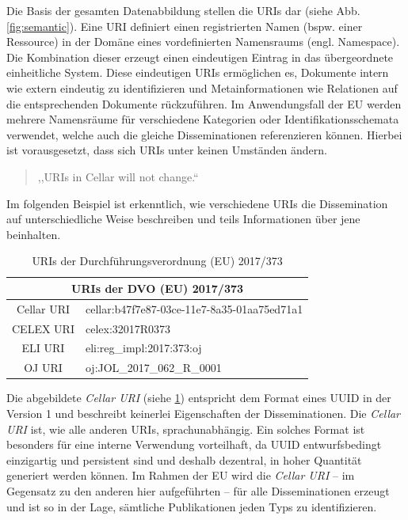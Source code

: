     Die Basis der gesamten Datenabbildung stellen die \acfp{URI} dar (siehe Abb. \ref{fig:semantic}).
    Eine URI definiert einen registrierten Namen (bspw. einer Ressource) in der Domäne eines vordefinierten Namensraums (engl. Namespace).
    Die Kombination dieser erzeugt einen eindeutigen Eintrag in das übergeordnete einheitliche System.
    \cite[2]{eu_uri_rfc1630}
    Diese eindeutigen \acp{URI} ermöglichen es, Dokumente intern wie extern eindeutig zu identifizieren und Metainformationen wie Relationen auf die entsprechenden Dokumente rückzuführen.
    Im Anwendungsfall der \ac{EU} werden mehrere Namensräume für verschiedene Kategorien oder Identifikationsschemata verwendet, welche auch die gleiche Disseminationen referenzieren können.
    Hierbei ist vorausgesetzt, dass sich \acp{URI} unter keinen Umständen ändern.
    \begin{quote}
        ,,URIs in Cellar will not change.`` \cite[9]{eu_cellar}
    \end{quote}
    Im folgenden Beispiel ist erkenntlich, wie verschiedene \acp{URI} die Dissemination auf unterschiedliche Weise beschreiben und teils Informationen über jene beinhalten.

    \begin{table}[h]
        \centering
        \begin{tabular}{|c|l|} \hline 
             \multicolumn{2}{|c|}{URIs der DVO (EU) 2017/373}\\ \hline 
             Cellar URI& cellar:b47f7e87-03ce-11e7-8a35-01aa75ed71a1\\ \hline 
             CELEX URI& celex:32017R0373\\ \hline 
             ELI URI&eli:reg\_impl:2017:373:oj\\ \hline
             OJ URI&oj:JOL\_2017\_062\_R\_0001\\ \hline 
        \end{tabular}
        \caption{URIs der Durchführungsverordnung (EU) 2017/373}
        \label{tab:uris}
    \end{table}
    
    Die abgebildete \textit{Cellar URI} (siehe \ref{tab:uris}) entspricht dem Format eines \acf{UUID} in der Version 1 und beschreibt keinerlei Eigenschaften der Disseminationen.
    Die \textit{Cellar URI} ist, wie alle anderen \acp{URI}, sprachunabhängig.
    Ein solches Format ist besonders für eine interne Verwendung vorteilhaft, da \ac{UUID} entwurfsbedingt einzigartig und persistent sind und deshalb dezentral, in hoher Quantität generiert werden können.  
    \cite[2]{eu_uuid_rfc4122}
    Im Rahmen der EU wird die \textit{Cellar \ac{URI}} -- im Gegensatz zu den anderen hier aufgeführten -- für alle Disseminationen erzeugt und ist so in der Lage, sämtliche Publikationen jeden Typs zu identifizieren.  

